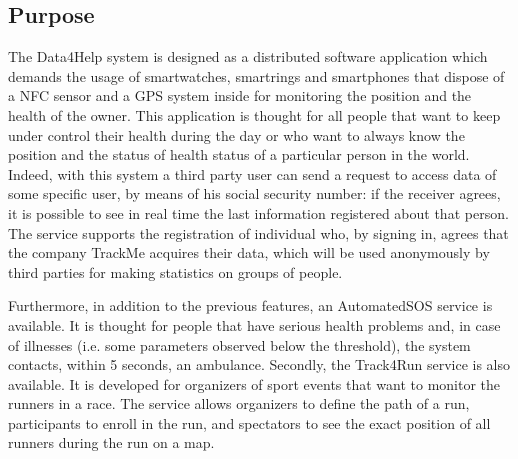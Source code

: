 \subsection{Purpose}
\par
The Data4Help system is designed as a distributed software application which demands the usage of  smartwatches, smartrings and smartphones that dispose of a NFC sensor and a GPS system inside for monitoring the position and the health of the owner. This application is thought for all people that want to keep under control their health during the day or who want to always know the position and the status of health status of a particular person in the world. Indeed, with this system a third party user can send a request to access data of some specific user, by means of his social security number: if the receiver agrees, it is possible to see in real time the last information registered about that person. The service supports the registration of individual who, by signing in, agrees that the company TrackMe acquires their data, which will be used anonymously by third parties for making statistics on groups of people.
\par 
Furthermore, in addition to the previous features, an AutomatedSOS service is available. It is thought for people that have serious health problems and, in case of illnesses (i.e. some parameters observed below the threshold), the system contacts, within 5 seconds, an ambulance. Secondly, the Track4Run service is also available. It is developed for organizers of sport events that want to monitor the runners in a race. The service allows organizers to define the path of a run, participants to enroll in the run, and spectators to see the exact position of all runners during the run on a map. \\


